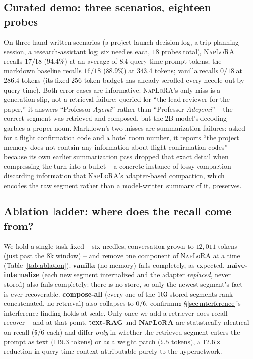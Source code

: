 \documentclass[11pt]{article}
\newcommand{\naplora}{\textsc{NapLoRA}}
\begin{document}
\subsection{Curated demo: three scenarios, eighteen probes}

On three hand-written scenarios (a project-launch decision log, a trip-planning session, a research-assistant log; six needles each, $18$ probes total), \naplora{} recalls $17/18$ ($94.4\%$) at an average of $8.4$ query-time prompt tokens; the markdown baseline recalls $16/18$ ($88.9\%$) at $343.4$ tokens; vanilla recalls $0/18$ at $286.4$ tokens (its fixed $256$-token budget has already scrolled every needle out by query time). Both error cases are informative. \naplora{}'s only miss is a generation slip, not a retrieval failure: queried for ``the lead reviewer for the paper,'' it answers ``Professor \emph{Ayemi}'' rather than ``Professor \emph{Adeyemi}'' -- the correct segment was retrieved and composed, but the $2$B model's decoding garbles a proper noun. Markdown's two misses are summarization failures: asked for a flight confirmation code and a hotel room number, it reports ``the project memory does not contain any information about flight confirmation codes'' because its own earlier summarization pass dropped that exact detail when compressing the turn into a bullet -- a concrete instance of lossy compaction discarding information that \naplora{}'s adapter-based compaction, which encodes the raw segment rather than a model-written summary of it, preserves.

\subsection{Ablation ladder: where does the recall come from?}
\label{sec:ablation}

We hold a single task fixed -- six needles, conversation grown to $12{,}011$ tokens (just past the $8$k window) -- and remove one component of \naplora{} at a time (Table~\ref{tab:ablation}). \textbf{vanilla} (no memory) fails completely, as expected. \textbf{naive-internalize} (each new segment internalized and the adapter \emph{replaced}, never stored) also fails completely: there is no store, so only the newest segment's fact is ever recoverable. \textbf{compose-all} (every one of the $103$ stored segments rank-concatenated, no retrieval) also collapses to $0/6$, confirming \S\ref{sec:interference}'s interference finding holds at scale. Only once we add a retriever does recall recover -- and at that point, \textbf{text-RAG} and \textbf{\naplora{}} are statistically identical on recall ($6/6$ each) and differ \emph{only} in whether the retrieved segment enters the prompt as text ($119.3$ tokens) or as a weight patch ($9.5$ tokens), a $12.6\times$ reduction in query-time context attributable purely to the hypernetwork.
\end{document}
